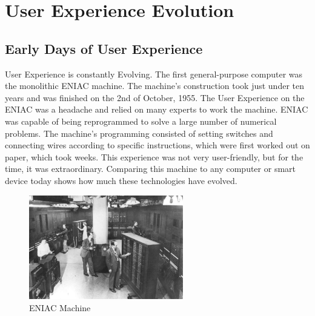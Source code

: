 \documentclass{article}
\begin{document}
\section{User Experience Evolution}

\subsection{Early Days of User Experience}
User Experience is constantly Evolving. The first general-purpose computer was the monolithic ENIAC machine. The machine’s construction took just under ten years and was finished on the 2nd of October, 1955. The User Experience on the ENIAC was a headache and relied on many experts to work the machine. ENIAC was capable of being reprogrammed to solve a large number of numerical problems. The machine’s programming consisted of setting switches and connecting wires according to specific instructions, which were first worked out on paper, which took weeks. This experience was not very user-friendly, but for the time, it was extraordinary. Comparing this machine to any computer or smart device today shows how much these technologies have evolved.
\cite{ref1}

\begin{figure}[h!]
    \caption{ENIAC Machine}
    \label{image:ENIAC}
    \centering
    \includegraphics[width=0.6\textwidth]{pics/eniac.jpg}
\end{figure}
\newpage
\end{document}
